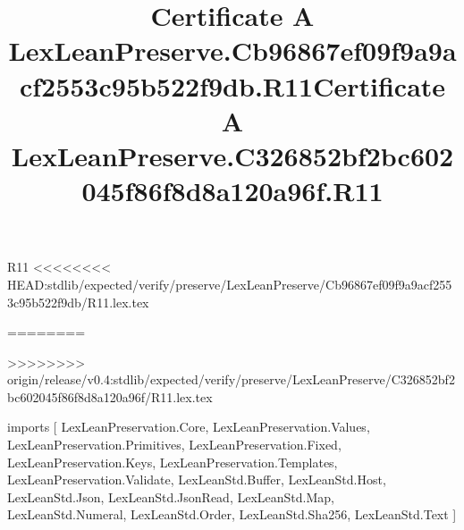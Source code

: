 \begin{lexlean}{R11}
<<<<<<<< HEAD:stdlib/expected/verify/preserve/LexLeanPreserve/Cb96867ef09f9a9acf2553c95b522f9db/R11.lex.tex
\title{Certificate A LexLeanPreserve.Cb96867ef09f9a9acf2553c95b522f9db.R11}
========
\title{Certificate A LexLeanPreserve.C326852bf2bc602045f86f8d8a120a96f.R11}
>>>>>>>> origin/release/v0.4:stdlib/expected/verify/preserve/LexLeanPreserve/C326852bf2bc602045f86f8d8a120a96f/R11.lex.tex
\begin{coremodule}
imports [
  LexLeanPreservation.Core,
  LexLeanPreservation.Values,
  LexLeanPreservation.Primitives,
  LexLeanPreservation.Fixed,
  LexLeanPreservation.Keys,
  LexLeanPreservation.Templates,
  LexLeanPreservation.Validate,
  LexLeanStd.Buffer,
  LexLeanStd.Host,
  LexLeanStd.Json,
  LexLeanStd.JsonRead,
  LexLeanStd.Map,
  LexLeanStd.Numeral,
  LexLeanStd.Order,
  LexLeanStd.Sha256,
  LexLeanStd.Text
]


\end{coremodule}
\end{lexlean}
